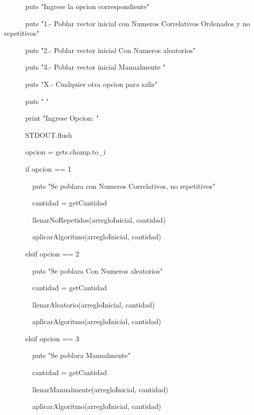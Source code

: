 {\noindent \ \ \ \ \ \       puts "Ingrese la opcion correspondiente"

\noindent \ \ \ \ \ \       puts "1.- Poblar vector inicial con Numeros Correlativos Ordenados y no repetitivos"

\noindent \ \ \ \ \ \       puts "2.- Poblar vector inicial Con Numeros aleatorios"

\noindent \ \ \ \ \ \       puts "3.- Poblar vector inicial Manualmente "

\noindent \ \ \ \ \ \       puts "X.- Cualquier otra opcion para salir"

\noindent \ \ \ \ \ \       puts " "

\noindent \ \ \ \ \ \       print "Ingrese Opcion: "

\noindent \ \ \ \ \ \       STDOUT.flush

\noindent \ \ \ \ \ \       opcion = gets.chomp.to\_i

\noindent \ \ \ \ \ \       if opcion == 1

\noindent \ \ \ \ \ \ \ \         puts "Se poblara con Numeros Correlativos, no repetitivos"

\noindent \ \ \ \ \ \ \ \         cantidad = getCantidad

\noindent \ \ \ \ \ \ \ \         llenarNoRepetidos(arregloInicial, cantidad)

\noindent \ \ \ \ \ \ \ \         aplicarAlgoritmo(arregloInicial, cantidad)

\bigskip 
\noindent \ \ \ \ \ \       elsif opcion == 2

\noindent \ \ \ \ \ \ \ \         puts "Se poblara Con Numeros aleatorios"

\noindent \ \ \ \ \ \ \ \         cantidad = getCantidad

\noindent \ \ \ \ \ \ \ \         llenarAleatorio(arregloInicial, cantidad)        

\noindent \ \ \ \ \ \ \ \         aplicarAlgoritmo(arregloInicial, cantidad)

\bigskip 
\noindent \ \ \ \ \ \       elsif opcion == 3

\noindent \ \ \ \ \ \ \ \       puts "Se poblara Manualmente"

\noindent \ \ \ \ \ \ \ \       cantidad = getCantidad

\noindent \ \ \ \ \ \ \ \       llenarManualmente(arregloInicial, cantidad)

\noindent \ \ \ \ \ \ \ \       aplicarAlgoritmo(arregloInicial, cantidad)

}
